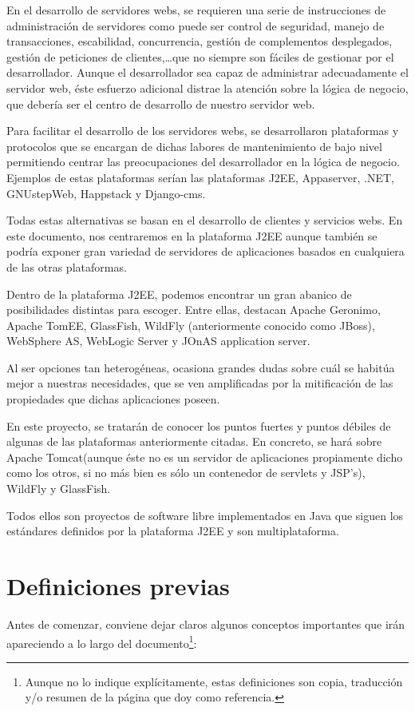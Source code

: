 \documentclass[a4paper, 10pt]{article}
\begin{document}
	En el desarrollo de servidores webs, se requieren una serie de instrucciones de
	administración de servidores como puede ser control de seguridad, manejo de
	transacciones, escabilidad, concurrencia, gestión de complementos desplegados,
	gestión de peticiones de clientes,\dots que no siempre son fáciles de gestionar por
	el desarrollador. Aunque el desarrollador sea capaz de administrar adecuadamente el
	servidor web, éste esfuerzo adicional distrae la atención sobre la lógica de negocio,
	que debería ser el centro de desarrollo de nuestro servidor web.
	
	Para facilitar el desarrollo de los servidores webs, se desarrollaron plataformas y
	protocolos que se encargan de dichas labores de mantenimiento de bajo nivel permitiendo
	centrar las preocupaciones del desarrollador en la lógica de negocio. Ejemplos de estas
	plataformas serían las plataformas J2EE, Appaserver, .NET, GNUstepWeb, Happstack y
	Django-cms.
	
	Todas estas alternativas se basan en el desarrollo de clientes y servicios webs. En
	este documento, nos centraremos en la plataforma J2EE aunque también se podría exponer
	gran variedad de servidores de aplicaciones basados en cualquiera de las otras plataformas.
	
	Dentro de la plataforma J2EE, podemos encontrar un gran abanico de posibilidades distintas
	para escoger. Entre ellas, destacan Apache Geronimo, Apache TomEE, GlassFish, WildFly
	(anteriormente conocido como JBoss), WebSphere AS, WebLogic Server y JOnAS application
	server.
	
	Al ser opciones tan heterogéneas, ocasiona grandes dudas sobre cuál se habitúa mejor a
	nuestras necesidades, que se ven amplificadas por la mitificación de las propiedades
	que dichas aplicaciones poseen.
	
	En este proyecto, se tratarán de conocer los puntos fuertes y puntos débiles de algunas
	de las plataformas anteriormente citadas. En concreto, se hará sobre Apache Tomcat(aunque
	éste no es un servidor de aplicaciones propiamente dicho como los otros, si no más bien
	es sólo un contenedor de servlets y JSP's), WildFly y GlassFish.
	
	Todos ellos son proyectos de software libre implementados en Java que siguen los
	estándares definidos por la plataforma J2EE y son multiplataforma.
	
\section{Definiciones previas}
	Antes de comenzar, conviene dejar claros algunos conceptos importantes que irán
	apareciendo	a lo largo del documento\footnote{Aunque no lo indique explícitamente,
	estas definiciones son copia, traducción y/o resumen de la página que doy como
	referencia.}:
\end{document}
